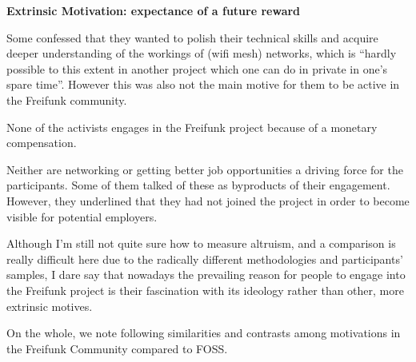 \textbf{Extrinsic Motivation: expectance of a future reward}

Some confessed that they wanted to polish their technical skills and acquire deeper understanding of the workings of (wifi mesh) networks, which is ``hardly possible to this extent in another project which one can do in private in one's spare time''.
However this was also not the main motive for them to be active in the Freifunk community.

None of the activists engages in the Freifunk project because of a monetary compensation.

Neither are networking or getting better job opportunities a driving force for the participants.
Some of them talked of these as byproducts of their engagement.
However, they underlined that they had not joined the project in order to become visible for potential employers.





Although I'm still not quite sure how to measure altruism, and a comparison is really difficult here due to the radically different methodologies and participants' samples, I dare say that nowadays the prevailing reason for people to engage into the Freifunk project is their fascination with its ideology rather than other, more extrinsic motives.



On the whole, we note following similarities and contrasts among motivations in the Freifunk Community compared to FOSS.

